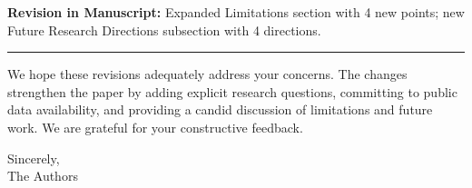 \documentclass[11pt,a4paper]{article}
\newcommand{\revision}[1]{%
  \noindent\textbf{Revision in Manuscript:} #1\vspace{4pt}}
\begin{document}
\revision{Expanded Limitations section with 4 new points; new Future Research Directions subsection with 4 directions.}

\vspace{12pt}
\noindent\rule{\textwidth}{0.4pt}
\vspace{6pt}

\noindent We hope these revisions adequately address your concerns. The changes strengthen the paper by adding explicit research questions, committing to public data availability, and providing a candid discussion of limitations and future work. We are grateful for your constructive feedback.

\vspace{12pt}
\noindent Sincerely,\\
The Authors
\end{document}
